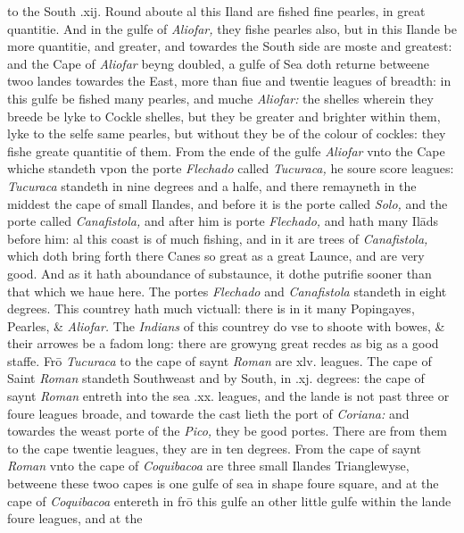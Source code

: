 \documentclass[11pt,twoside]{article}\makeatletter
\begin{document}
	\normalmarginpar
       to the South .xij. Round aboute al this Iland are fished fine pearles, in great quantitie. And in the gulfe of {\itshape Aliofar,} they fishe pearles also, but in this Ilande be more quantitie, and greater, and towardes the South side are moste and grea­test: and the Cape of {\itshape Aliofar} beyng doubled, a gulfe of Sea doth returne betweene twoo landes towardes the East, more than fiue and twentie leagues of breadth: in this gulfe be fi­shed many pearles, and muche {\itshape Aliofar:} the shelles wherein they breede be lyke to Cockle shelles, but they be greater and brighter within them, lyke to the selfe same pearles, but with­out they be of the colour of cockles: they fishe greate quan­titie of them. From the ende of the gulfe {\itshape Aliofar} vnto the Cape whiche standeth vpon the porte {\itshape Flechado} called {\itshape Tucu­raca,} he soure score leagues: {\itshape Tucuraca} standeth in nine de­grees and a halfe, and there remayneth in the middest the cape of small Ilandes, and before it is the porte called {\itshape Solo,} and the porte called {\itshape Canafistola,} and after him is porte {\itshape Flechado,} and hath many Ilāds before him: al this coast is of much fishing, and in it are trees of {\itshape Canafistola,} which doth bring forth there Canes so great as a great Launce, and are very good. And as it hath aboundance of substaunce, it dothe putrifie sooner than that which we haue here. The portes {\itshape Flechado} and {\itshape Canafistola} standeth in eight degrees. This countrey hath much victuall: 
	\normalmarginpar
       there is in it many Popingayes, Pearles, \& {\itshape Aliofar.} The {\itshape In­dians} of this countrey do vse to shoote with bowes, \& their ar­rowes be a fadom long: there are growyng great recdes as %
 big as a good staffe. Frō {\itshape Tucuraca} to the cape of saynt {\itshape Roman} are xlv. leagues. The cape of Saint {\itshape Roman} standeth South­weast and by South, in .xj. degrees: the cape of saynt {\itshape Roman} entreth into the sea .xx. leagues, and the lande is not past three or foure leagues broade, and towarde the cast lieth the port of {\itshape Coriana:} and towardes the weast porte of the {\itshape Pico,} they be good portes. There are from them to the cape twentie leagues, they are in ten degrees. From the cape of saynt {\itshape Roman} vnto the cape of {\itshape Coquibacoa} are three small Ilandes Trianglewyse, betweene these twoo capes is one gulfe of sea in shape foure square, and at the cape of {\itshape Coquibacoa} entereth in frō this gulfe an other little gulfe within the lande foure leagues, and at the 
\end{document}
